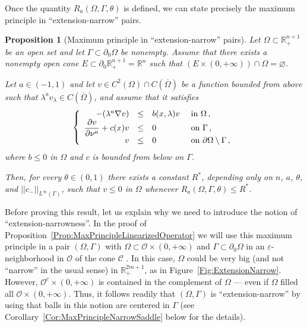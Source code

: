 \documentclass[twoside,leqno,symbols-for-thanks, draft]{rmi}
\numberwithin{equation}{section}
\newtheorem{proposition}[theorem]{Proposition}
\theoremstyle{definition}
\newcommand{\con}[1]{\mathbb{#1}}
\newcommand{\R}{\con{R}} %
\newcommand{\ccal}{\mathscr{C}}
\newcommand{\ocal}{\mathcal{O}}
\newcommand{\norm}[1]{\left | \left |{#1} \right | \right |}
\newcommand\beqc[1]{\left\{\begin{array}{#1}}
\newcommand\eeqc{\end{array} \right.}
\def\PDEsystem{rcll}
\let\div\relax
\DeclareMathOperator{\div}{div}
\begin{document}
Once the quantity  $R_a(\Omega,\Gamma, \theta)$ is defined, we can state precisely the maximum principle in ``extension-narrow'' pairs.

\begin{proposition}[Maximum principle in ``extension-narrow'' pairs]
	\label{Prop:MaxPrincipleNarrow}
	Let $\Omega \subset \R^{n+1}_+$ be an open set and let $\Gamma \subset \partial_0 \Omega$ be nonempty. Assume that there exists a nonempty open cone $E\subset \partial_0 \R^{n+1}_+ = \R^n$ such that $(E \times (0,+\infty))\cap \Omega=\varnothing$. 
	
	Let $a\in (-1,1)$ and let $v \in C^2 (\Omega)\cap C(\overline{\Omega})$ be a function bounded from above such that $\lambda^a v_\lambda \in C (\overline{\Omega})$, and assume that it satisfies
	\begin{equation}
	\label{Eq:MaxPrincipleNarrow}
	\beqc{\PDEsystem}
	-\div(\lambda^a \nabla v) &\leq& b(x,\lambda) v & \text{ in } \Omega\,, \\
	\dfrac{\partial v}{\partial \nu^a}  + c(x) v &\leq & 0 & \text{ on } \Gamma \,, \\
	v & \leq & 0 & \text{ on } \partial \Omega \setminus \Gamma \,,
	\eeqc
	\end{equation}
	where $b \leq 0$ in $\Omega$ and $c$ is bounded from below on $\Gamma$.
	
	Then, for every $\theta \in (0,1)$ there exists a constant $R^*$, depending only on $n$, $a$, $\theta$, and $\norm{c_-}_{L^\infty(\Gamma)}$, such that $v\leq 0 $ in $\Omega$ whenever $R_a(\Omega,\Gamma,\theta) \leq R^*$.
\end{proposition}



Before proving this result, let us explain why we need to introduce the notion of ``extension-narrowness''\!. In the proof of Proposition~\ref{Prop:MaxPrincipleLinearizedOperator} we will use this maximum principle in a pair $(\Omega, \Gamma)$ with $\Omega \subset \ocal \times (0,+\infty)$ and $\Gamma \subset \partial_0 \Omega$ in an $\varepsilon$-neighborhood in $\ocal$ of the cone $\ccal$ . In this case, $\Omega$ could  be very big (and not ``narrow'' in the usual sense) in $\R^{2m+1}_+$, as in Figure~\ref{Fig:ExtensionNarrow}. However, $\ocal^c\times (0,+\infty)$ is contained in the complement of $\Omega$ --- even if $\Omega$ filled all $\ocal\times (0,+\infty)$. Thus, it follows readily that $(\Omega,\Gamma)$ is ``extension-narrow'' by using that balls in this notion are centered in $\Gamma$ (see Corollary~\ref{Cor:MaxPrincipleNarrowSaddle} below for the details).
\end{document}
